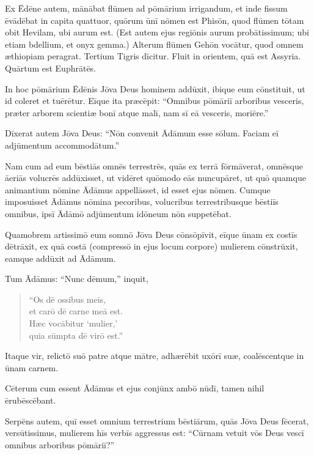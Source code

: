 \Versus Ex Ēdēne autem, mānābat flūmen ad pōmārium irrigandum, et inde fissum ēvādēbat in capita quattuor,
\Versus quōrum ūnī nōmen est Phisōn, quod flūmen tōtam obit Hevilam, ubi aurum est.
\Versus (Est autem ejus regiōnis aurum probātissimum; ubi etiam bdellium, et onyx gemma.)
\Versus Alterum flūmen Gehōn vocātur, quod omnem æthiopiam peragrat.
\Versus Tertium Tigris dīcitur. Fluit in orientem, quā est Assyria. Quārtum est Euphrātēs.

\Versus In hoc pōmārium Ēdēnis Jōva Deus hominem addūxit, ibique eum cōnstituit, ut id coleret et tuērētur.
\Versus Eīque ita præcēpit: ``Omnibus pōmāriī arboribus vesceris,
\Versus præter arborem scientiæ bonī atque malī, nam sī eā vesceris, moriēre.''

\Versus Dīxerat autem Jōva Deus: ``Nōn convenit Ādāmum esse sōlum. Faciam eī adjūmentum accommodātum.''

\Versus Nam cum ad eum bēstiās omnēs terrestrēs, quās ex terrā fōrmāverat, omnēsque āeriās volucrēs addūxisset, ut vidēret quōmodo eās nuncupāret, ut quō quamque animantium nōmine Ādāmus appellāsset, id esset ejus nōmen.
\Versus Cumque imposuisset Ādāmus nōmina pecoribus, volucribus terrestribusque bēstiīs omnibus, ipsī Ādāmō adjūmentum idōneum nōn suppetēbat.

\Versus Quamobrem artissimō eum somnō Jōva Deus cōnsōpīvit, eīque ūnam ex costīs dētrāxit, ex quā costā (compressō in ejus locum corpore)
\Versus mulierem cōnstrūxit, eamque addūxit ad Ādāmum.

\Versus Tum Ādāmus: ``Nunc dēmum,'' inquit,
\begin{verse}
\begin{patverse*}
 ``Os dē ossibus meīs, \\
 et carō dē carne meā est. \\
 Hæc vocābitur `mulier,' \\
 quia sūmpta dē virō est.''
\end{patverse*}
\end{verse}

\Versus Itaque vir, relictō suō patre atque mātre, adhærēbit uxōrī suæ, coalēscentque in ūnam carnem.

\Versus Cēterum cum essent Ādāmus et ejus conjūnx ambō nūdī, tamen nihil ērubēscēbant.



\Caput
\Versus Serpēns autem, quī esset omnium terrestrium bēstiārum, quās Jōva Deus fēcerat, versūtissimus, mulierem hīs verbīs aggressus est: ``Cūrnam vetuit vōs Deus vescī omnibus arboribus pōmāriī?''

